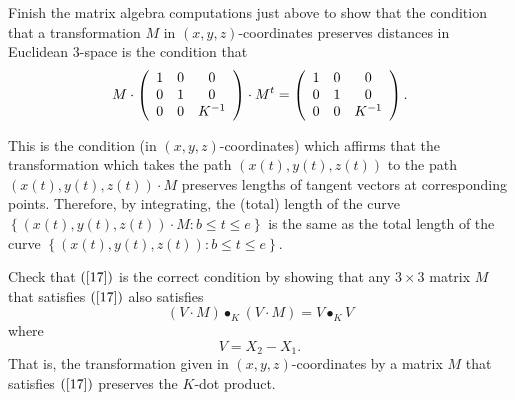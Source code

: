\documentclass{ximera}
\begin{document}
\begin{exercise}
Finish the matrix algebra computations just above to show that the condition
that a transformation $M$ in $\left(  x,y,z\right)  $-coordinates preserves
distances in Euclidean $3$-space is the condition that%
\begin{equation}
M\cdot\left(
\begin{array}
[c]{ccc}%
1 & 0 & 0\\
0 & 1 & 0\\
0 & 0 & K^{-1}%
\end{array}
\right)  \cdot M^{t}=\left(
\begin{array}
[c]{ccc}%
1 & 0 & 0\\
0 & 1 & 0\\
0 & 0 & K^{-1}%
\end{array}
\right)  . \label{17}%
\end{equation}

\end{exercise}

This is the condition (in $\left(  x,y,z\right)  $-coordinates) which affirms
that the transformation which takes the path $\left(  x(t),y(t),z(t)\right)  $
to the path $\left(  x(t),y(t),z(t)\right)  \cdot M$ preserves lengths of
tangent vectors at corresponding points. Therefore, by integrating, the
(total) length of the curve $\left\{  \left(  x(t),y(t),z(t)\right)  \cdot
M:b\leq t\leq e\right\}  $ is the same as the total length of the curve
$\left\{  \left(  x(t),y(t),z(t)\right)  :b\leq t\leq e\right\}  $.

\begin{exercise}
Check that $\left(  \ref{17}\right)  $ is the correct condition by showing
that any $3\times3$ matrix $M$ that satisfies $\left(  \ref{17}\right)  $ also
satisfies%
\[
\left(   V  \cdot M\right)  \bullet_{K}\left(   V
\cdot M\right)  =V\bullet_{K}V
\]
where%
\[
V=X_{2}-X_{1}.
\]
That is, the transformation given in $\left(  x,y,z\right)  $-coordinates by a
matrix $M$ that satisfies $\left(  \ref{17}\right)  $ preserves the $K$-dot product.
\end{exercise}
\end{document}
